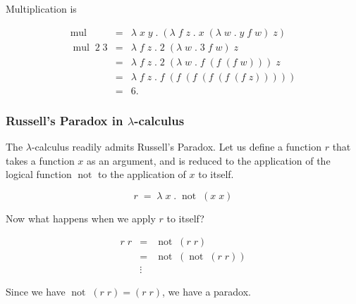 \documentclass[12pt]{article}
\DeclareMathOperator{\mul}{mul}
\DeclareMathOperator{\Not}{not}
\begin{document}
Multiplication is

\begin{eqnarray*}
\mul & = & \lambda\;x\;y\;.\;(\lambda\;f\;z\;.\;x\;(\lambda\;w\;.\;y\;f\;w)\;z) \\
\mul\;2\;3 & = & \lambda\;f\;z\;.\;2\;(\lambda\;w\;.\;3\;f\;w)\;z \\
& = & \lambda\;f\;z\;.\;2\;(\lambda\;w\;.\;f\;(f\;(f\;w)))\;z \\
& = & \lambda\;f\;z\;.\;f\;(f\;(f\;(f\;(f\;(f\;z))))) \\
& = & 6.
\end{eqnarray*}

\subsubsection*{Russell's Paradox in $\lambda$-calculus}

The $\lambda$-calculus readily admits Russell's Paradox.
Let us define a function $r$ that takes a function $x$ as an argument, and is reduced to the application of the logical function $\Not$ to the application of $x$ to itself.

$$
r\;=\;\lambda\;x\;.\;\Not\;(x\;x)
$$

Now what happens when we apply $r$ to itself?

\begin{eqnarray*}
r\;r & = & \Not\;(r\;r) \\
    & = & \Not\;(\Not\;(r\;r)) \\
    & \vdots &
\end{eqnarray*}

Since we have $\Not\;(r\;r) = (r\;r)$, we have a paradox.
\end{document}
